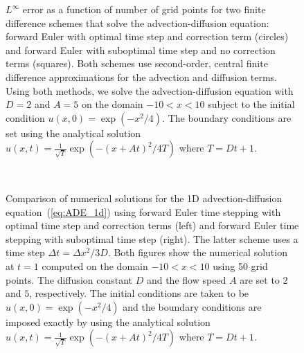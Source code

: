 \documentclass[oneeqnum,onefignum,onetabnum,onethmnum]{siamltex}
\begin{document}
\begin{figure}[htb]
\begin{center}
\caption{$L^\infty$ error as a function of number of grid points for 
two finite difference schemes that solve the advection-diffusion 
equation: forward Euler with optimal time step and correction term (circles) 
and forward Euler with suboptimal time step and no correction terms (squares).  
Both schemes use second-order, central finite difference approximations for 
the advection and diffusion terms.
Using both methods, we solve the advection-diffusion equation with $D = 2$
and $A = 5$ on the domain $-10 < x < 10$ subject to the initial condition
$u(x,0) = \exp(-x^2/4)$.  The boundary conditions are set using the
analytical solution 
$u(x,t) = \frac{1}{\sqrt{T}} \exp \left( -(x+At)^2/4T \right)$
where $T = Dt+1$.
}
\label{fig:ADE_1d_error}
\end{center}
\end{figure}

\begin{figure}[htb]
\begin{center}
\ \ \ \ \
\caption{Comparison of numerical solutions for the 1D advection-diffusion
equation~(\ref{eq:ADE_1d}) using forward Euler time stepping with 
optimal time step and correction terms (left) and forward Euler time 
stepping with suboptimal time step (right).  The latter scheme uses a 
time step $\Delta t = \Delta x^2 / 3 D$.  Both figures show the numerical
solution at $t = 1$ computed on the domain $-10 < x < 10$ using 50 grid points.
The diffusion constant $D$ and the flow speed $A$ are set to $2$ and $5$,
respectively.
The initial conditions are taken to be $u(x,0) = \exp \left( -x^2/4 \right)$
and the boundary conditions are imposed exactly by using the analytical 
solution $u(x,t) = \frac{1}{\sqrt{T}} \exp \left( -(x+At)^2/4T \right)$
where $T = Dt+1$.
}
\label{fig:burgers_1d_solns}
\end{center}
\end{figure}
\end{document}
